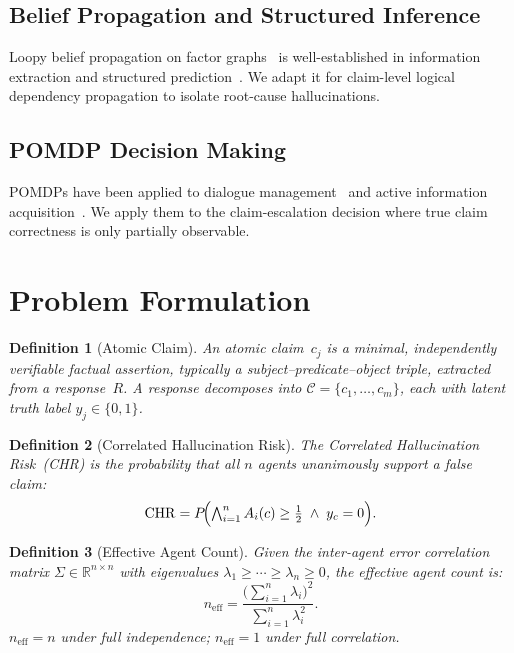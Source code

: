 \documentclass[conference]{IEEEtran}
\newtheorem{definition}{Definition}
\begin{document}
\subsection{Belief Propagation and Structured Inference}
Loopy belief propagation on factor graphs~\cite{pearl1988}
is well-established in information extraction and structured
prediction~\cite{mcallester2007}.
We adapt it for claim-level logical dependency propagation
to isolate root-cause hallucinations.

\subsection{POMDP Decision Making}
POMDPs have been applied to dialogue management~\cite{young2013}
and active information acquisition~\cite{spaan2012}.
We apply them to the claim-escalation decision where true
claim correctness is only partially observable.

\section{Problem Formulation}
\label{sec:formulation}

\begin{definition}[Atomic Claim]
\label{def:claim}
An \emph{atomic claim}~$c_j$ is a minimal, independently
verifiable factual assertion, typically a
subject--predicate--object triple, extracted from a response~$R$.
A response decomposes into
$\mathcal{C} = \{c_1, \ldots, c_m\}$, each with latent truth
label $y_j \in \{0, 1\}$.
\end{definition}

\begin{definition}[Correlated Hallucination Risk]
\label{def:chr}
The \emph{Correlated Hallucination Risk~(CHR)} is the probability
that all $n$ agents unanimously support a false claim:
\begin{equation}
  \mathrm{CHR} = P\!\Bigl(
    \textstyle\bigwedge_{i=1}^n A_i(c) \geq \tfrac{1}{2}
    \;\wedge\; y_c = 0
  \Bigr).
  \label{eq:chr}
\end{equation}
\end{definition}

\begin{definition}[Effective Agent Count]
\label{def:neff}
Given the inter-agent error correlation matrix
$\Sigma \in \mathbb{R}^{n \times n}$ with eigenvalues
$\lambda_1 \geq \cdots \geq \lambda_n \geq 0$,
the \emph{effective agent count} is:
\begin{equation}
  n_\text{eff} = \frac{\bigl(\sum_{i=1}^n \lambda_i\bigr)^2}
                      {\sum_{i=1}^n \lambda_i^2}.
  \label{eq:neff}
\end{equation}
$n_\text{eff} = n$ under full independence; $n_\text{eff} = 1$
under full correlation.
\end{definition}
\end{document}
